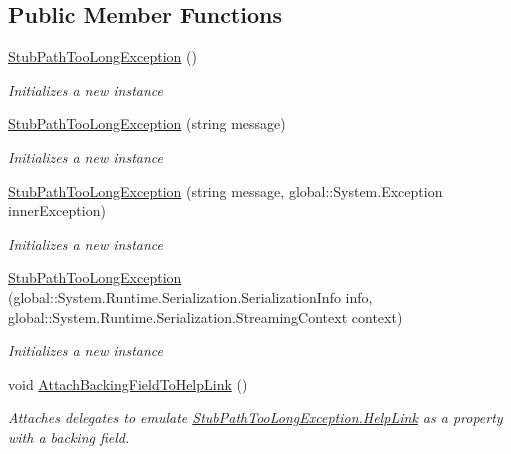 \subsection*{Public Member Functions}
\begin{DoxyCompactItemize}
\item 
\hyperlink{class_system_1_1_i_o_1_1_fakes_1_1_stub_path_too_long_exception_a2c850872cd6fa2a3654ab95aec2ab3c0}{Stub\-Path\-Too\-Long\-Exception} ()
\begin{DoxyCompactList}\small\item\em Initializes a new instance\end{DoxyCompactList}\item 
\hyperlink{class_system_1_1_i_o_1_1_fakes_1_1_stub_path_too_long_exception_aeda956b1e28b756db5477c132d3b422a}{Stub\-Path\-Too\-Long\-Exception} (string message)
\begin{DoxyCompactList}\small\item\em Initializes a new instance\end{DoxyCompactList}\item 
\hyperlink{class_system_1_1_i_o_1_1_fakes_1_1_stub_path_too_long_exception_a5de06ed8d895179dd6fe2b41bfee8652}{Stub\-Path\-Too\-Long\-Exception} (string message, global\-::\-System.\-Exception inner\-Exception)
\begin{DoxyCompactList}\small\item\em Initializes a new instance\end{DoxyCompactList}\item 
\hyperlink{class_system_1_1_i_o_1_1_fakes_1_1_stub_path_too_long_exception_a3209d1a8eea6444fc8c2aabc22af5cd3}{Stub\-Path\-Too\-Long\-Exception} (global\-::\-System.\-Runtime.\-Serialization.\-Serialization\-Info info, global\-::\-System.\-Runtime.\-Serialization.\-Streaming\-Context context)
\begin{DoxyCompactList}\small\item\em Initializes a new instance\end{DoxyCompactList}\item 
void \hyperlink{class_system_1_1_i_o_1_1_fakes_1_1_stub_path_too_long_exception_affe20f4909a0a7126c0c63b2c103ab3a}{Attach\-Backing\-Field\-To\-Help\-Link} ()
\begin{DoxyCompactList}\small\item\em Attaches delegates to emulate \hyperlink{class_system_1_1_i_o_1_1_fakes_1_1_stub_path_too_long_exception_a2bd1c8a4bf0c1a1dd3a19629e7fe5d0b}{Stub\-Path\-Too\-Long\-Exception.\-Help\-Link} as a property with a backing field.\end{DoxyCompactList}\item 

\end{DoxyCompactItemize}
